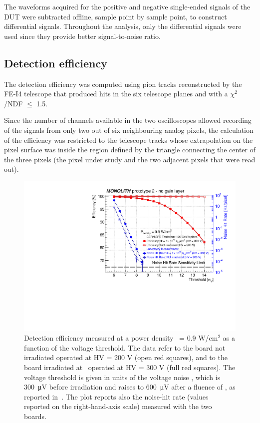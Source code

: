 		The waveforms acquired for the positive and negative single-ended signals of the DUT were subtracted offline, sample point by sample point, to construct differential signals. Throughout the analysis, only the differential signals were used since they provide better signal-to-noise ratio. 


		\subsection{Detection efficiency}
		The detection efficiency was computed using pion tracks reconstructed by the FE-I4 telescope that produced hits in the six telescope planes and with a $\chi^2$/NDF $\le$ 1.5.

		Since the number of channels available in the two oscilloscopes allowed recording of the signals from only two out of six neighbouring analog pixels, the calculation of the efficiency was restricted to the telescope tracks whose extrapolation on the pixel surface was inside the region defined by the triangle connecting the center of the three pixels (the pixel under study and the two adjacent pixels that were read out).
		\begin{figure}[h]
			\centering
			\includegraphics[width=.85\textwidth]{files/MONOLITH_Irradiated_paper/M06_M16}
			\caption{Detection efficiency measured at a power density \power~= 0.9 W/cm$^2$ as a function of the voltage threshold. The data refer to the board not irradiated operated at HV = 200 V (open red squares), and to the board irradiated at \maxflu~operated at HV = 300 V (full red squares). The voltage threshold is given in units of the voltage noise \noise, which is \SI{300}{\micro\volt} before irradiation and raises to \SI{600}{\micro\volt} after a fluence of \maxflu, as reported in~\cite{LabRad_Mono2023}. The plot reports also the noise-hit rate (values reported on the right-hand-axis scale) measured with the two boards.}
			\label{im:MONO-IR_HV_vs_th} 
		\end{figure}
		

